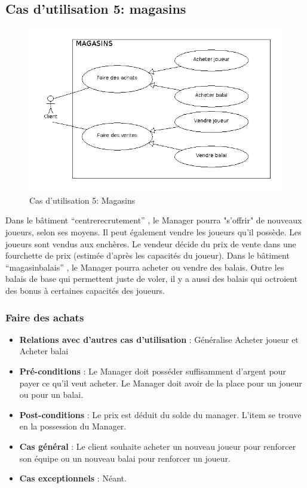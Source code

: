 \documentclass[a4paper,titlepage]{scrreprt}
\begin{document}
  \subsection{Cas d'utilisation 5: magasins}
  \begin{figure}[H]
    \center
    \includegraphics[scale=0.5]{uml/useCaseView/Magasins.png}
    \caption{Cas d'utilisation 5: Magasins}
  \end{figure}
  Dans le bâtiment \enquote{\gls{centrerecrutement}} , le Manager pourra "s'offrir" de nouveaux joueurs, 
  selon ses moyens. Il peut également vendre les joueurs qu'il possède. Les joueurs sont vendus aux enchères. Le vendeur décide du prix de vente dans une fourchette de prix (estimée d'après les capacités du joueur).
  Dans le bâtiment \enquote{\gls{magasinbalais}} , le Manager pourra acheter ou vendre des balais. Outre les balais de base qui permettent juste de voler, 
  il y a aussi des balais qui octroient des bonus à certaines capacités des joueurs.
    \subsubsection{Faire des achats}
      \begin{itemize}
        \item \textbf{Relations avec d'autres cas d'utilisation}  : Généralise Acheter joueur et Acheter balai
        \item \textbf{Pré-conditions} : Le Manager doit posséder suffisamment d’argent pour payer ce qu’il veut acheter. Le Manager doit avoir de la place pour un joueur ou pour un balai.
        \item \textbf{Post-conditions} : Le prix est déduit du solde du manager. L'item se trouve en la possession du Manager.
        \item \textbf{Cas général} : Le client souhaite acheter un nouveau joueur pour renforcer son équipe ou un nouveau balai pour renforcer un joueur.
        \item \textbf{Cas exceptionnels} : Néant.
      \end{itemize}
\end{document}
